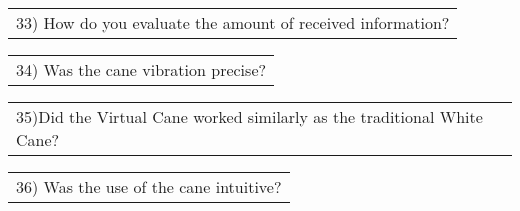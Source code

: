 \begin{table}[!thb]
    
    

    \begin{tabular}{m{1\linewidth}}
        \vspace{1ex}
        33)	How do you evaluate the amount of received information?
    \end{tabular}

    
    

    \begin{tabular}{m{1\linewidth}}
        \vspace{1ex}
        34)	Was the cane vibration precise?
    \end{tabular}

    
    

    \begin{tabular}{m{1\linewidth}}
        \vspace{1ex}
        35)Did the Virtual Cane worked similarly as the traditional White Cane?
    \end{tabular}

    
    

    \begin{tabular}{m{1\linewidth}}
        \vspace{1ex}
        36)	Was the use of the cane intuitive?
    \end{tabular}

    
    

\end{table}

\FloatBarrier
\pagebreak

